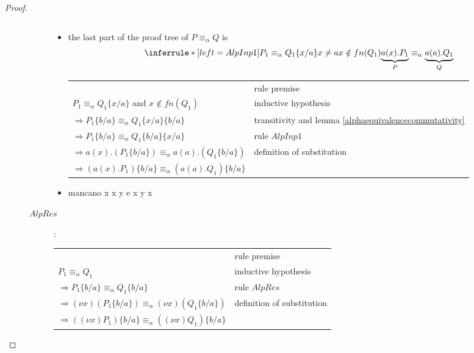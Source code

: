 \begin{lemma}
\begin{proof}
\begin{description}
\begin{description}
\begin{itemize}
\begin{center}
\begin{tabular}{ll}
		  \\
		  \end{tabular}
		\end{center}	    	
	      \item 
		the last part of the proof tree of $P\equiv_{\alpha}Q$ is
		\[\inferrule*[left=AlpInp1]{
		    P_{1}\equiv_{\alpha}Q_{1}\{x/a\}
		  \\
		    x\neq a
		  \\
		    x\notin fn(Q_{1})
		}{
		  \underbrace{a(x).P_{1}}_{P}
		    \equiv_{\alpha}
		      \underbrace{a(a).Q_{1}}_{Q}
		}\]
		\begin{center}
		  \begin{tabular}{ll}
		      &
		    rule premise
		  \\
		    $P_{1}\equiv_{\alpha}Q_{1}\{x/a\}$ and $x\notin fn(Q_{1})$ 
		      &
		    inductive hypothesis
		  \\
		    $\Rightarrow P_{1}\{b/a\}\equiv_{\alpha}Q_{1}\{x/a\}\{b/a\}$
		      &
		    transitivity and lemma \ref{alphaequivalencecommutativity}
		  \\
		    $\Rightarrow P_{1}\{b/a\}\equiv_{\alpha}Q_{1}\{b/a\}\{x/a\}$
		      &
		    rule $AlpInp1$
		  \\
		    $\Rightarrow a(x).(P_{1}\{b/a\})\equiv_{\alpha}a(a).(Q_{1}\{b/a\})$
		      &
		    definition of substitution
		  \\
		    $\Rightarrow (a(x).P_{1})\{b/a\}\equiv_{\alpha}(a(a).Q_{1})\{b/a\}$
		      &		    
		  \\
		  \end{tabular}
		\end{center}	    	
	      \item mancano x x y e x y x
	    \end{itemize}
	  \item[$AlpRes$]:
	    \begin{center}
	      \begin{tabular}{ll}
		&rule premise\\
		$P_{1}\equiv_{\alpha}Q_{1}$&inductive hypothesis\\
		$\Rightarrow P_{1}\{b/a\}\equiv_{\alpha}Q_{1}\{b/a\}$&rule $AlpRes$\\
		$\Rightarrow (\nu x)(P_{1}\{b/a\})\equiv_{\alpha}(\nu x)(Q_{1}\{b/a\}) $&definition of substitution\\
		$\Rightarrow ((\nu x)P_{1})\{b/a\}\equiv_{\alpha}((\nu x)Q_{1})\{b/a\} $&\\
	      \end{tabular}
	    \end{center}	    	    

\end{description}
\end{description}
\end{proof}
\end{lemma}
